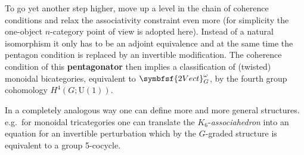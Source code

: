     To go yet another step higher, move up a level in the chain of coherence conditions and relax the associativity constraint even more (for simplicity the one-object $n$-category point of view is adopted here). Instead of a natural isomorphism it only has to be an adjoint equivalence and at the same time the pentagon condition is replaced by an invertible modification. The coherence condition of this \textbf{pentagonator} then implies a classification of (twisted) monoidal bicategories, equivalent to $\symbfsf{2Vect}_G^\omega$, by the fourth group cohomology $H^4(G;\mathrm{U}(1))$.

    In a completely analogous way one can define more and more general structures. e.g.~for monoidal tricategories one can translate the $K_6$-\textit{associahedron} into an equation for an invertible perturbation which by the $G$-graded structure is equivalent to a group 5-cocycle.

